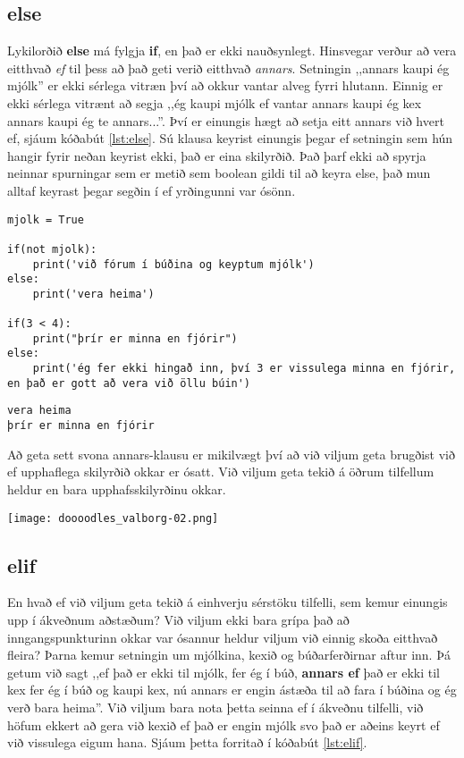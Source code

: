 \subsection{else}
Lykilorðið \textbf{else} má fylgja \textbf{if}, en það er ekki nauðsynlegt.
Hinsvegar verður að vera eitthvað \emph{ef} til þess að það geti verið eitthvað \emph{annars}.
Setningin ,,annars kaupi ég mjólk'' er ekki sérlega vitræn því að okkur vantar alveg fyrri hlutann.
Einnig er ekki sérlega vitrænt að segja ,,ég kaupi mjólk ef vantar annars kaupi ég kex annars kaupi ég te annars...''.
Því er einungis hægt að setja eitt annars við hvert ef, sjáum kóðabút \ref{lst:else}.
Sú klausa keyrist einungis þegar ef setningin sem hún hangir fyrir neðan keyrist ekki, það er eina skilyrðið.
Það þarf ekki að spyrja neinnar spurningar sem er metið sem boolean gildi til að keyra else, það mun alltaf keyrast þegar segðin í ef yrðingunni var ósönn.

\newpage

\begin{lstlisting}[caption=else notað, label=lst:else]
mjolk = True

if(not mjolk):
	print('við fórum í búðina og keyptum mjólk')
else:
	print('vera heima')

if(3 < 4):
	print("þrír er minna en fjórir")
else:
	print('ég fer ekki hingað inn, því 3 er vissulega minna en fjórir, en það er gott að vera við öllu búin')
\end{lstlisting}
\lstset{style=uttak}
\begin{lstlisting}
vera heima
þrír er minna en fjórir
\end{lstlisting}
\lstset{style=venjulegt}

Að geta sett svona annars-klausu er mikilvægt því að við viljum geta brugðist við ef upphaflega skilyrðið okkar er ósatt.
Við viljum geta tekið á öðrum tilfellum heldur en bara upphafsskilyrðinu okkar.
	\begin{center}
		\texttt{[image: doooodles\_valborg-02.png]}
	\end{center}

\subsection{elif}
En hvað ef við viljum geta tekið á einhverju sérstöku tilfelli, sem kemur einungis upp í ákveðnum aðstæðum?
Við viljum ekki bara grípa það að inngangspunkturinn okkar var ósannur heldur viljum við einnig skoða eitthvað fleira?
Þarna kemur setningin um mjólkina, kexið og búðarferðirnar aftur inn.
Þá getum við sagt ,,ef það er ekki til mjólk, fer ég í búð, \textbf{annars ef} það er ekki til kex fer ég í búð og kaupi kex, nú annars er engin ástæða til að fara í búðina og ég verð bara heima''.
Við viljum bara nota þetta seinna ef í ákveðnu tilfelli, við höfum ekkert að gera við kexið ef það er engin mjólk svo það er aðeins keyrt ef við vissulega eigum hana.
Sjáum þetta forritað í kóðabút \ref{lst:elif}.

